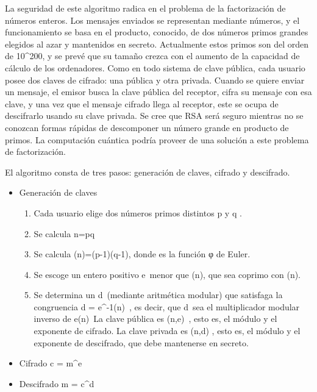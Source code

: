 \documentclass[spanish]{article}
\begin{document}
La seguridad de este algoritmo radica en el problema de la factorización de números enteros. Los mensajes enviados se representan mediante números, y el funcionamiento se basa en el producto, conocido, de dos números primos grandes elegidos al azar y mantenidos en secreto. Actualmente estos primos son del orden de 10^{200}, y se prevé que su tamaño crezca con el aumento de la capacidad de cálculo de los ordenadores.
Como en todo sistema de clave pública, cada usuario posee dos claves de cifrado: una pública y otra privada. Cuando se quiere enviar un mensaje, el emisor busca la clave pública del receptor, cifra su mensaje con esa clave, y una vez que el mensaje cifrado llega al receptor, este se ocupa de descifrarlo usando su clave privada.
Se cree que RSA será seguro mientras no se conozcan formas rápidas de descomponer un número grande en producto de primos. La computación cuántica podría proveer de una solución a este problema de factorización.

El algoritmo consta de tres pasos: generación de claves, cifrado y descifrado.

\begin{itemize}
\item Generación de claves
\begin{enumerate}
\item Cada usuario elige dos números primos distintos p  y q .
\item Se calcula n=pq
\item Se calcula \varphi (n)=(p-1)(q-1), donde \varphi es la función φ de Euler.
\item Se escoge un entero positivo e\  menor que \varphi (n), que sea coprimo con \varphi (n).
\item Se determina un d\  (mediante aritmética modular) que satisfaga la congruencia d =  e^{-1}\mod\varphi(n)\ , es decir, que d\  sea el multiplicador modular inverso de e\mod\varphi(n)\ 
La clave pública es (n,e)\ , esto es, el módulo y el exponente de cifrado. La clave privada es (n,d) , esto es, el módulo y el exponente de descifrado, que debe mantenerse en secreto.
\end{enumerate}
\item Cifrado
c = m^{e}
\item  Descifrado
m = c^{d}
\end{itemize}
\end{document}
